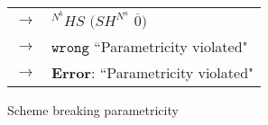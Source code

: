 \begin{figure}
\begin{tabular}{ll}
\vspace{5pt}

$\rightarrow$ & ${^{N^{b}}H}S$ $(SH^{N^{a}}$ $\overline{0})$ \\

\vspace{5pt}

$\rightarrow$ & $\mathtt{wrong}$ ``Parametricity violated" \\

\vspace{5pt}

$\rightarrow$ & \textbf{Error}: ``Parametricity violated"
\end{tabular}
\caption{Scheme breaking parametricity}
\label{parametricity-example-2}
\end{figure}